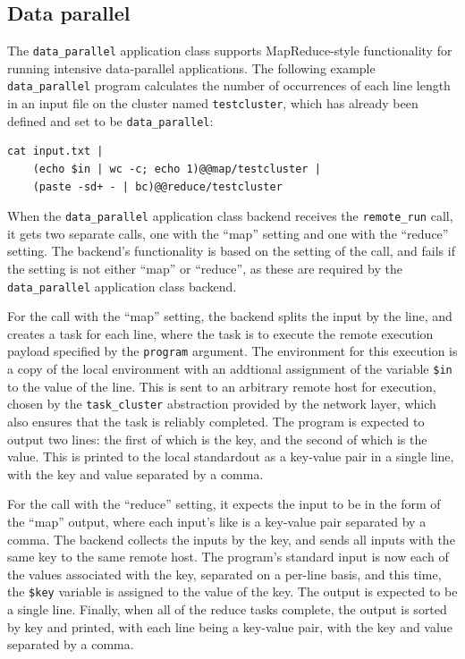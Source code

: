 \documentclass[twoside]{report}
\begin{document}
\subsection{Data parallel}

The \texttt{data\_parallel} application class supports MapReduce-style functionality for running intensive data-parallel applications.
The following example \texttt{data\_parallel} program calculates the number of occurrences of each line length in an input file on the cluster named \texttt{testcluster}, which has already been defined and set to be \texttt{data\_parallel}:

\begin{minipage}[c]{\textwidth-15pt}
  \begin{lstlisting}[language=shard]
cat input.txt |
    (echo $in | wc -c; echo 1)@@map/testcluster |
    (paste -sd+ - | bc)@@reduce/testcluster
\end{lstlisting}
  \smallskip
\end{minipage}

When the \texttt{data\_parallel} application class backend receives the \texttt{remote\_run} call, it gets two separate calls, one with the ``map'' setting and one with the ``reduce'' setting.
The backend's functionality is based on the setting of the call, and fails if the setting is not either ``map'' or ``reduce'', as these are required by the \texttt{data\_parallel} application class backend.

For the call with the ``map'' setting, the backend splits the input by the line, and creates a task for each line, where the task is to execute the remote execution payload specified by the \texttt{program} argument.
The environment for this execution is a copy of the local environment with an addtional assignment of the variable \texttt{\$in} to the value of the line.
This is sent to an arbitrary remote host for execution, chosen by the \texttt{task\_cluster} abstraction provided by the network layer, which also ensures that the task is reliably completed.
The program is expected to output two lines: the first of which is the key, and the second of which is the value.
This is printed to the local standardout as a key-value pair in a single line, with the key and value separated by a comma.

For the call with the ``reduce'' setting, it expects the input to be in the form of the ``map'' output, where each input's like is a key-value pair separated by a comma.
The backend collects the inputs by the key, and sends all inputs with the same key to the same remote host.
The program's standard input is now each of the values associated with the key, separated on a per-line basis, and this time, the \texttt{\$key} variable is assigned to the value of the key.
The output is expected to be a single line.
Finally, when all of the reduce tasks complete, the output is sorted by key and printed, with each line being a key-value pair, with the key and value separated by a comma.
\end{document}
